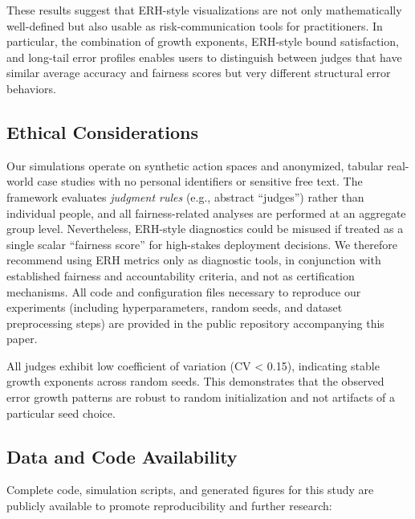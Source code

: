 \documentclass[12pt,a4paper]{article}
\theoremstyle{definition}
\theoremstyle{remark}
\begin{document}
These results suggest that ERH-style visualizations are not only mathematically well-defined but also usable as risk-communication tools for practitioners. In particular, the combination of growth exponents, ERH-style bound satisfaction, and long-tail error profiles enables users to distinguish between judges that have similar average accuracy and fairness scores but very different structural error behaviors.

\subsection{Ethical Considerations}

Our simulations operate on synthetic action spaces and anonymized, tabular real-world case studies with no personal identifiers or sensitive free text. The framework evaluates \emph{judgment rules} (e.g., abstract ``judges'') rather than individual people, and all fairness-related analyses are performed at an aggregate group level. Nevertheless, ERH-style diagnostics could be misused if treated as a single scalar ``fairness score'' for high-stakes deployment decisions. We therefore recommend using ERH metrics only as diagnostic tools, in conjunction with established fairness and accountability criteria, and not as certification mechanisms. All code and configuration files necessary to reproduce our experiments (including hyperparameters, random seeds, and dataset preprocessing steps) are provided in the public repository accompanying this paper.

All judges exhibit low coefficient of variation (CV < 0.15), indicating stable growth exponents across random seeds. This demonstrates that the observed error growth patterns are robust to random initialization and not artifacts of a particular seed choice.

\subsection{Data and Code Availability}

Complete code, simulation scripts, and generated figures for this study are publicly available to promote reproducibility and further research:
\end{document}
